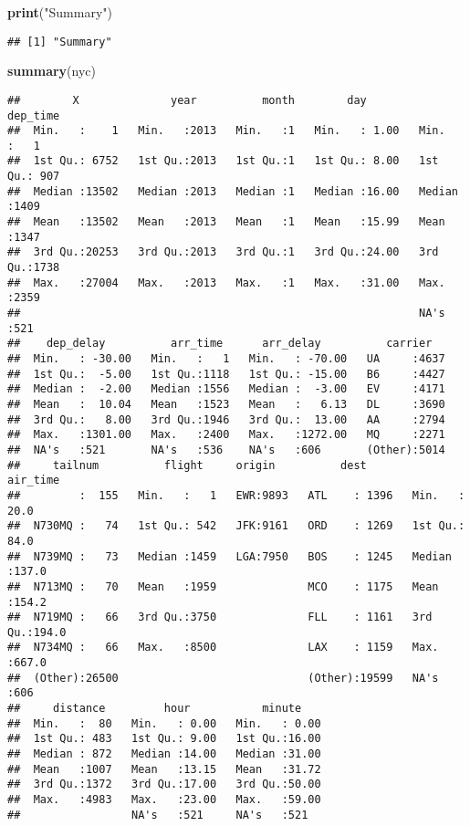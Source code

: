 \documentclass[]{article}
\newenvironment{Shaded}{\begin{snugshade}}{\end{snugshade}}
\newcommand{\KeywordTok}[1]{\textcolor[rgb]{0.13,0.29,0.53}{\textbf{#1}}}
\newcommand{\StringTok}[1]{\textcolor[rgb]{0.31,0.60,0.02}{#1}}
\newcommand{\NormalTok}[1]{#1}
\begin{document}
\begin{Shaded}
\begin{Highlighting}[]
\KeywordTok{print}\NormalTok{(}\StringTok{"Summary"}\NormalTok{)}
\end{Highlighting}
\end{Shaded}

\begin{verbatim}
## [1] "Summary"
\end{verbatim}

\begin{Shaded}
\begin{Highlighting}[]
\KeywordTok{summary}\NormalTok{(nyc)}
\end{Highlighting}
\end{Shaded}

\begin{verbatim}
##        X              year          month        day           dep_time   
##  Min.   :    1   Min.   :2013   Min.   :1   Min.   : 1.00   Min.   :   1  
##  1st Qu.: 6752   1st Qu.:2013   1st Qu.:1   1st Qu.: 8.00   1st Qu.: 907  
##  Median :13502   Median :2013   Median :1   Median :16.00   Median :1409  
##  Mean   :13502   Mean   :2013   Mean   :1   Mean   :15.99   Mean   :1347  
##  3rd Qu.:20253   3rd Qu.:2013   3rd Qu.:1   3rd Qu.:24.00   3rd Qu.:1738  
##  Max.   :27004   Max.   :2013   Max.   :1   Max.   :31.00   Max.   :2359  
##                                                             NA's   :521   
##    dep_delay          arr_time      arr_delay          carrier    
##  Min.   : -30.00   Min.   :   1   Min.   : -70.00   UA     :4637  
##  1st Qu.:  -5.00   1st Qu.:1118   1st Qu.: -15.00   B6     :4427  
##  Median :  -2.00   Median :1556   Median :  -3.00   EV     :4171  
##  Mean   :  10.04   Mean   :1523   Mean   :   6.13   DL     :3690  
##  3rd Qu.:   8.00   3rd Qu.:1946   3rd Qu.:  13.00   AA     :2794  
##  Max.   :1301.00   Max.   :2400   Max.   :1272.00   MQ     :2271  
##  NA's   :521       NA's   :536    NA's   :606       (Other):5014  
##     tailnum          flight     origin          dest          air_time    
##         :  155   Min.   :   1   EWR:9893   ATL    : 1396   Min.   : 20.0  
##  N730MQ :   74   1st Qu.: 542   JFK:9161   ORD    : 1269   1st Qu.: 84.0  
##  N739MQ :   73   Median :1459   LGA:7950   BOS    : 1245   Median :137.0  
##  N713MQ :   70   Mean   :1959              MCO    : 1175   Mean   :154.2  
##  N719MQ :   66   3rd Qu.:3750              FLL    : 1161   3rd Qu.:194.0  
##  N734MQ :   66   Max.   :8500              LAX    : 1159   Max.   :667.0  
##  (Other):26500                             (Other):19599   NA's   :606    
##     distance         hour           minute     
##  Min.   :  80   Min.   : 0.00   Min.   : 0.00  
##  1st Qu.: 483   1st Qu.: 9.00   1st Qu.:16.00  
##  Median : 872   Median :14.00   Median :31.00  
##  Mean   :1007   Mean   :13.15   Mean   :31.72  
##  3rd Qu.:1372   3rd Qu.:17.00   3rd Qu.:50.00  
##  Max.   :4983   Max.   :23.00   Max.   :59.00  
##                 NA's   :521     NA's   :521
\end{verbatim}
\end{document}
